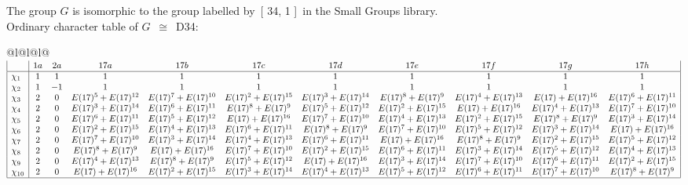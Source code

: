 \documentclass[varwidth=\maxdimen,border=10]{standalone}
\begin{document}
The group $G$ is isomorphic to the group labelled by\ [ 34, 1 ]\ in the Small Groups library.\\
Ordinary character table of $G$\ $\cong$\ D34:\\
\begin{center}
\begin{tabular}{@{}l@{}l@{}l@{}}
\hline
\(\begin{array}{|l|cccccccccc|}
  & 1a & 2a & 17a & 17b & 17c & 17d & 17e & 17f & 17g & 17h\\ \hline
\chi_{1} & 1 & 1 & 1 & 1 & 1 & 1 & 1 & 1 & 1 & 1\\
\chi_{2} & 1 & -1 & 1 & 1 & 1 & 1 & 1 & 1 & 1 & 1\\
\chi_{3} & 2 & 0 & E(17)^{5}+E(17)^{12} & E(17)^{7}+E(17)^{10} & E(17)^{2}+E(17)^{15} & E(17)^{3}+E(17)^{14} & E(17)^{8}+E(17)^{9} & E(17)^{4}+E(17)^{13} & E(17)+E(17)^{16} & E(17)^{6}+E(17)^{11}\\
\chi_{4} & 2 & 0 & E(17)^{3}+E(17)^{14} & E(17)^{6}+E(17)^{11} & E(17)^{8}+E(17)^{9} & E(17)^{5}+E(17)^{12} & E(17)^{2}+E(17)^{15} & E(17)+E(17)^{16} & E(17)^{4}+E(17)^{13} & E(17)^{7}+E(17)^{10}\\
\chi_{5} & 2 & 0 & E(17)^{6}+E(17)^{11} & E(17)^{5}+E(17)^{12} & E(17)+E(17)^{16} & E(17)^{7}+E(17)^{10} & E(17)^{4}+E(17)^{13} & E(17)^{2}+E(17)^{15} & E(17)^{8}+E(17)^{9} & E(17)^{3}+E(17)^{14}\\
\chi_{6} & 2 & 0 & E(17)^{2}+E(17)^{15} & E(17)^{4}+E(17)^{13} & E(17)^{6}+E(17)^{11} & E(17)^{8}+E(17)^{9} & E(17)^{7}+E(17)^{10} & E(17)^{5}+E(17)^{12} & E(17)^{3}+E(17)^{14} & E(17)+E(17)^{16}\\
\chi_{7} & 2 & 0 & E(17)^{7}+E(17)^{10} & E(17)^{3}+E(17)^{14} & E(17)^{4}+E(17)^{13} & E(17)^{6}+E(17)^{11} & E(17)+E(17)^{16} & E(17)^{8}+E(17)^{9} & E(17)^{2}+E(17)^{15} & E(17)^{5}+E(17)^{12}\\
\chi_{8} & 2 & 0 & E(17)^{8}+E(17)^{9} & E(17)+E(17)^{16} & E(17)^{7}+E(17)^{10} & E(17)^{2}+E(17)^{15} & E(17)^{6}+E(17)^{11} & E(17)^{3}+E(17)^{14} & E(17)^{5}+E(17)^{12} & E(17)^{4}+E(17)^{13}\\
\chi_{9} & 2 & 0 & E(17)^{4}+E(17)^{13} & E(17)^{8}+E(17)^{9} & E(17)^{5}+E(17)^{12} & E(17)+E(17)^{16} & E(17)^{3}+E(17)^{14} & E(17)^{7}+E(17)^{10} & E(17)^{6}+E(17)^{11} & E(17)^{2}+E(17)^{15}\\
\chi_{10} & 2 & 0 & E(17)+E(17)^{16} & E(17)^{2}+E(17)^{15} & E(17)^{3}+E(17)^{14} & E(17)^{4}+E(17)^{13} & E(17)^{5}+E(17)^{12} & E(17)^{6}+E(17)^{11} & E(17)^{7}+E(17)^{10} & E(17)^{8}+E(17)^{9}\\
\hline
\end{array}\)\\
\end{tabular}
\end{center}
\end{document}
